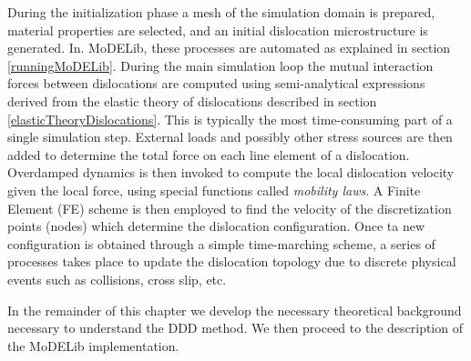  During the initialization phase a mesh of the simulation domain is prepared, material properties are selected, and an initial dislocation microstructure is generated. In. MoDELib, these processes are automated as explained in section \ref{runningMoDELib}. During the main simulation loop the mutual interaction forces between dislocations are computed using semi-analytical expressions derived from the elastic theory of dislocations described in section \ref{elasticTheoryDislocations}. This is typically the most time-consuming part of a single simulation step. External loads and possibly other stress sources are then added to determine the total force on each line element of a dislocation. Overdamped dynamics is then invoked to compute the local dislocation velocity given the local force, using special functions called \textit{mobility laws}. A Finite Element (FE) scheme is then employed to find the velocity of the discretization points (nodes) which determine the dislocation configuration. Once ta new configuration is obtained through a simple time-marching scheme, a series of processes takes place to update the dislocation topology due to discrete physical events such as collisions, cross slip, etc.

In the remainder of this chapter we develop the necessary theoretical background necessary to understand the  DDD method. We then proceed to the description of the MoDELib implementation. 

